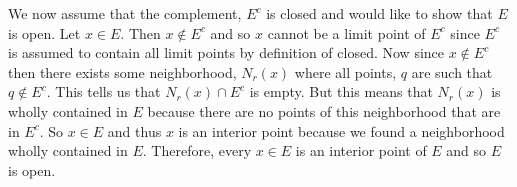 \documentclass[12pt]{article}
\begin{document}
We now assume that the complement, $E^{c}$  is closed and would like to show that $E$ is open. Let $x \in E$. Then $x \notin E^{c}$ and so $x$ cannot be a limit point of $E^{c}$ since $E^{c}$ is assumed to contain all limit points by definition of closed. Now since $x \notin E^{c}$ then there exists some neighborhood, $N_{r}(x)$ where all points, $q$ are such that $q \notin E^{c}$. This tells us that $N_{r}(x) \cap E^{c}$ is empty. But this means that $N_{r}(x)$ is wholly contained in $E$ because there are no points of this neighborhood that are in $E^{c}$. So $x \in E$ and thus $x$ is an interior point because we found a neighborhood wholly contained in $E$. Therefore, every $x \in E$ is an interior point of $E$ and so $E$ is open.\\ \\
\end{document}
